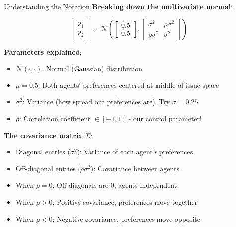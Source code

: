 \documentclass{beamer}
\begin{document}
\begin{frame}{Understanding the Notation}
\textbf{Breaking down the multivariate normal}:

\begin{equation*}
\begin{bmatrix} p_1 \\ p_2 \end{bmatrix} \sim \mathcal{N}\left(\begin{bmatrix} 0.5 \\ 0.5 \end{bmatrix}, \begin{bmatrix} \sigma^2 & \rho\sigma^2 \\ \rho\sigma^2 & \sigma^2 \end{bmatrix}\right)
\end{equation*}

\textbf{Parameters explained}:
\begin{itemize}
    \item $\mathcal{N}(\cdot, \cdot)$: Normal (Gaussian) distribution
    \item $\mu = 0.5$: Both agents' preferences centered at middle of issue space
    \item $\sigma^2$: Variance (how spread out preferences are). Try $\sigma = 0.25$
    \item $\rho$: Correlation coefficient $\in [-1, 1]$ - our control parameter!
\end{itemize}

\vspace{0.3cm}

\textbf{The covariance matrix $\Sigma$}:
\begin{itemize}
    \item Diagonal entries ($\sigma^2$): Variance of each agent's preferences
    \item Off-diagonal entries ($\rho\sigma^2$): Covariance between agents
    \item When $\rho = 0$: Off-diagonals are 0, agents independent
    \item When $\rho > 0$: Positive covariance, preferences move together
    \item When $\rho < 0$: Negative covariance, preferences move opposite
\end{itemize}
\end{frame}
\end{document}
